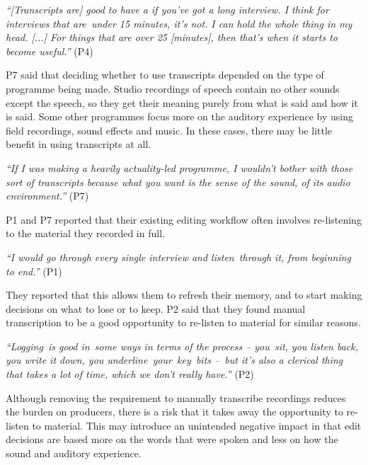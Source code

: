 \textit{``[Transcripts are] good to have a if you've got a long interview. I think for interviews that are under
  15 minutes, it's not. I can hold the whole thing in my head. [...] For things that are over 25 [minutes], then that's
when it starts to become useful.''} (P4)

P7 said that deciding whether to use transcripts depended on the type of programme being made. Studio recordings of
speech contain no other sounds except the speech, so they get their meaning purely from what is said and how it is
said. Some other programmes focus more on the auditory experience by using field recordings, sound effects and music.
In these cases, there may be little benefit in using transcripts at all.

\textit{``If I was making a heavily actuality-led programme, I wouldn't bother with those sort of transcripts because
what you want is the sense of the sound, of its audio environment.''} (P7)




P1 and P7 reported that their existing editing workflow often involves re-listening to the material they recorded in
full.

\textit{``I would go through every single interview and listen through it, from beginning to end.''} (P1)

They reported that this allows them to refresh their memory, and to start making decisions on what to lose or to keep.
P2 said that they found manual transcription to be a good opportunity to re-listen to material for similar
reasons.

\textit{``Logging is good in some ways in terms of the process -- you sit, you listen back, you write it down, you
underline your key bits -- but it's also a clerical thing that takes a lot of time, which we don't really have.''} (P2)

Although removing the requirement to manually transcribe recordings reduces the burden on producers, there is a risk
that it takes away the opportunity to re-listen to material. This may introduce an unintended negative impact in that
edit decisions are based more on the words that were spoken and less on how the sound and auditory experience.

